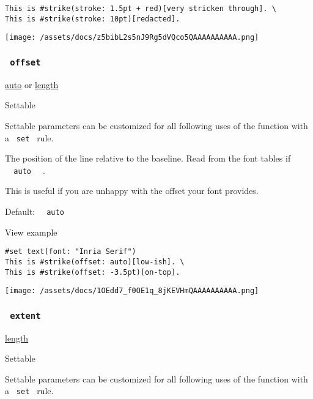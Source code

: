 \begin{verbatim}
This is #strike(stroke: 1.5pt + red)[very stricken through]. \
This is #strike(stroke: 10pt)[redacted].
\end{verbatim}

\texttt{[image: /assets/docs/z5bibL2s5nJ9Rg5dVQco5QAAAAAAAAAA.png]}

\subsubsection{\texorpdfstring{\texttt{\ offset\ }}{ offset }}\label{parameters-offset}

\href{/docs/reference/foundations/auto/}{auto} {or}
\href{/docs/reference/layout/length/}{length}

{{ Settable }}

\label{parameters-offset-settable-tooltip}
Settable parameters can be customized for all following uses of the
function with a \texttt{\ set\ } rule.

The position of the line relative to the baseline. Read from the font
tables if \texttt{\ }{\texttt{\ auto\ }}\texttt{\ } .

This is useful if you are unhappy with the offset your font provides.

Default: \texttt{\ }{\texttt{\ auto\ }}\texttt{\ }


View example

\begin{verbatim}
#set text(font: "Inria Serif")
This is #strike(offset: auto)[low-ish]. \
This is #strike(offset: -3.5pt)[on-top].
\end{verbatim}

\texttt{[image: /assets/docs/1OEdd7\_f0OE1q\_8jKEVHmQAAAAAAAAAA.png]}

\subsubsection{\texorpdfstring{\texttt{\ extent\ }}{ extent }}\label{parameters-extent}

\href{/docs/reference/layout/length/}{length}

{{ Settable }}

\label{parameters-extent-settable-tooltip}
Settable parameters can be customized for all following uses of the
function with a \texttt{\ set\ } rule.

